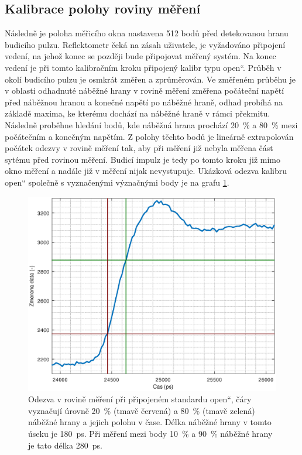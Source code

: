 \subsection{Kalibrace polohy roviny měření}
Následně je poloha měřicího okna nastavena 512 bodů před detekovanou hranu budicího pulzu. Reflektometr čeká na zásah uživatele, je vyžadováno připojení vedení, na jehož konec se později bude připojovat měřený systém. Na konec vedení je při tomto kalibračním kroku připojený kalibr typu \quotedblbase open\textquotedblleft. Průběh v okolí budicího pulzu je osmkrát změřen a zprůměrován. Ve změřeném průběhu je v oblasti odhadnuté náběžné hrany v rovině měření změřena počáteční napětí před náběžnou hranou a konečné napětí po náběžné hraně, odhad probíhá na základě maxima, ke kterému dochází na náběžné hraně v rámci překmitu. Následně proběhne hledání bodů, kde náběžná hrana prochází \SI{20}{\percent} a \SI{80}{\percent} mezi počátečním a konečným napětím. Z polohy těchto bodů je lineárně extrapolován počátek odezvy v rovině měření tak, aby při měření již nebyla měřena část sytému před rovinou měření. Budicí impulz je tedy po tomto kroku již mimo okno měření a nadále již v měření nijak nevystupuje. Ukázková odezva kalibru \quotedblbase open\textquotedblleft{} společně s vyznačenými význačnými body je na grafu \ref{rising_edge_DUT_open}.

\begin{figure}[H]
\includegraphics[width=\textwidth,keepaspectratio]{images/rising_edge_DUT_open.eps}\caption{Odezva v rovině měření při připojeném standardu \quotedblbase open\textquotedblleft , čáry vyznačují úrovně \SI{20}{\percent} (tmavě červená) a \SI{80}{\percent} (tmavě zelená) náběžné hrany a jejich polohu v čase. Délka náběžné hrany v tomto úseku je \SI{180}{\pico\second}. Při měření mezi body \SI{10}{\percent} a \SI{90}{\percent} náběžné hrany je tato délka \SI{280}{\pico\second}.}\label{rising_edge_DUT_open}
\end{figure}

